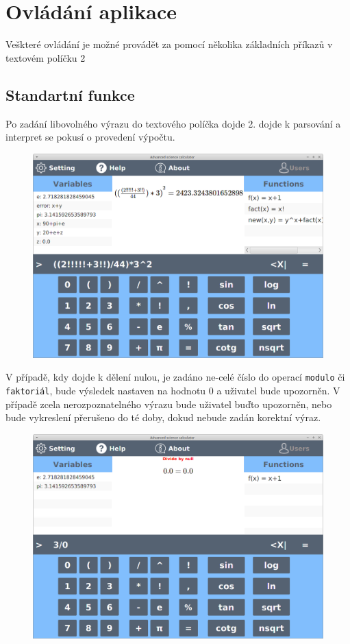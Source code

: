 \documentclass[11pt, a4paper, titlepage]{article}
\begin{document}
	\section{Ovládání aplikace}

	Veškteré ovládání je možné provádět za pomocí několika základních příkazů v textovém políčku 2

	\newpage

	\subsection{Standartní funkce}

	Po zadání libovolného výrazu do textového políčka dojde 2. dojde k parsování a interpret se pokusí
	o provedení výpočtu.

	\begin{figure}[h!]
	    \centering
	    \includegraphics[scale=0.3]{./assets/screenshot.png}
	\end{figure}

	V případě, kdy dojde k dělení nulou, je zadáno ne-celé číslo do operací \texttt{modulo} či \texttt{faktoriál},
	bude výsledek nastaven na hodnotu 0 a uživatel bude upozorněn. V případě zcela nerozpoznatelného výrazu bude
	uživatel buďto upozorněn, nebo bude vykreslení přerušeno do té doby, dokud nebude zadán korektní výraz.

	\begin{figure}[h!]
	    \centering
	    \includegraphics[scale=0.3]{./assets/null.png}
	\end{figure}
\end{document}
